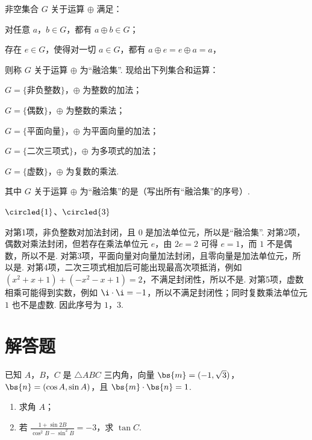 \begin{problem}
非空集合 \(G\) 关于运算 \(\oplus\) 满足：

\begin{circlelist}
\item 对任意 \(a\)，\(b\in G\)，都有 \(a\oplus b\in G\)；
\item 存在 \(e\in G\)，使得对一切 \(a\in G\)，都有 \(a\oplus e=e\oplus a=a\)，
\end{circlelist}

则称 \(G\) 关于运算 \(\oplus\) 为“融洽集”. 现给出下列集合和运算：

\begin{circlelist}
\item \(G=\{\text{非负整数}\}\)，\(\oplus\) 为整数的加法；
\item \(G=\{\text{偶数}\}\)，\(\oplus\) 为整数的乘法；
\item \(G=\{\text{平面向量}\}\)，\(\oplus\) 为平面向量的加法；
\item \(G=\{\text{二次三项式}\}\)，\(\oplus\) 为多项式的加法；
\item \(G=\{\text{虚数}\}\)，\(\oplus\) 为复数的乘法.
\end{circlelist}

其中 \(G\) 关于运算 \(\oplus\) 为“融洽集”的是\fillinblank{}（写出所有“融洽集”的序号）.
\end{problem}

\begin{answer}
\(\circled{1}\)、\(\circled{3}\)
\end{answer}

\begin{solution}
对第1项，非负整数对加法封闭，且 \(0\) 是加法单位元，所以是“融洽集”. 对第2项，偶数对乘法封闭，但若存在乘法单位元 \(e\)，由 \(2e=2\) 可得 \(e=1\)，而 \(1\) 不是偶数，所以不是. 对第3项，平面向量对向量加法封闭，且零向量是加法单位元，所以是. 对第4项，二次三项式相加后可能出现最高次项抵消，例如 \((x^2+x+1)+(-x^2-x+1)=2\)，不满足封闭性，所以不是. 对第5项，虚数相乘可能得到实数，例如 \(\i\cdot\i=-1\)，所以不满足封闭性；同时复数乘法单位元 \(1\) 也不是虚数. 因此序号为 \(1\)，\(3\).
\end{solution}

\section{解答题}
\begin{problem}
已知 \(A\)，\(B\)，\(C\) 是 \(\triangle ABC\) 三内角，向量 \(\bs{m}=(-1,\sqrt{3})\)，\(\bs{n}=(\cos A,\sin A)\)，且 \(\bs{m}\cdot \bs{n}=1\).

\begin{enumerate}
\item 求角 \(A\)；
\item 若 \(\frac{1+\sin2B}{\cos^{2}B-\sin^{2}B}=-3\)，求 \(\tan C\).
\end{enumerate}
\end{problem}

